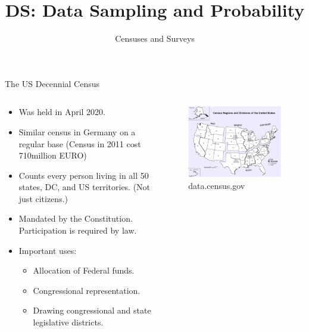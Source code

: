 \documentclass[aspectratio=169]{../latex_main/tntbeamer}  %
\title[Censuses and Surveys]{DS: Data Sampling and Probability}
\subtitle{Censuses and Surveys}
\begin{document}
	
	\maketitle
	
	\begin{frame}{The US Decennial Census}

          \vspace*{-2em}
	     \begin{columns}
	         \begin{column}{.5\textwidth}
	         \begin{itemize}
	             \item Was held in April 2020.
                \item Similar census in Germany on a regular base (Census in 2011 cost 710million EURO)
	             \item Counts every person living in all 50 states, DC, and US territories. (Not just citizens.)
	             \item Mandated by the Constitution. Participation is required by law.
	             \item Important uses:
	             \begin{itemize}
	                 \item Allocation of Federal funds.
	                 \item Congressional representation.
	                 \item Drawing congressional and state legislative districts.
	             \end{itemize}
	         \end{itemize}
	         

	         \end{column}
	         \begin{column}{.4\textwidth}
	                \begin{figure}
	                    \centering
	                    \includegraphics[scale=.7]{Bild6}
	                    \caption{data.census.gov}
	                \end{figure}
	                


\end{column}
\end{columns}
\end{frame}
\end{document}
